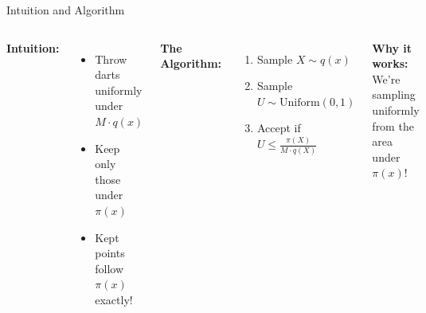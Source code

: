 \begin{frame}{Intuition and Algorithm}
	\begin{columns}
		\textbf{Intuition:}
		\begin{itemize}
			\item Throw darts uniformly under $M \cdot q(x)$
			\item Keep only those under $\pi(x)$
			\item Kept points follow $\pi(x)$ exactly!
		\end{itemize}

		\vspace{0.2cm}
		\textbf{The Algorithm:}
		\begin{enumerate}
			\item Sample $X \sim q(x)$
			\item Sample $U \sim \text{Uniform}(0,1)$
			\item Accept if $U \leq \frac{\pi(X)}{M \cdot q(X)}$
		\end{enumerate}

		\vspace{0.2cm}
		\textbf{Why it works:} We're sampling uniformly from the area under $\pi(x)$!

		\begin{center}
			\includegraphics[width=0.95\textwidth]{rejectionsamplingcriterion.png}
		\end{center}
	\end{columns}
\end{frame}

